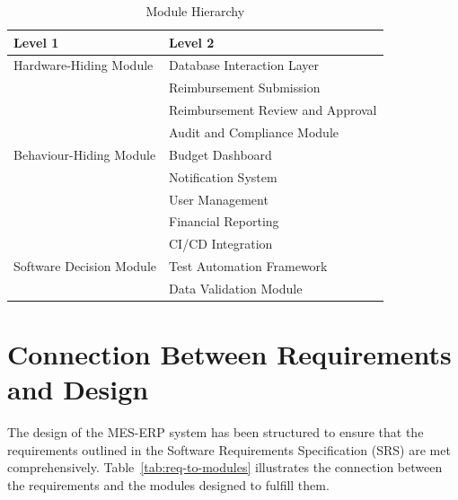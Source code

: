 \documentclass[12pt, titlepage]{article}
\begin{document}
\begin{table}[H] 
\centering
\renewcommand{\arraystretch}{1.5}
\begin{tabular}{p{} p{}}
\toprule
\textbf{Level 1} & \textbf{Level 2}\\
\midrule

{Hardware-Hiding Module} & Database Interaction Layer \\ 
\midrule

\multirow{7}{0.3\textwidth}{Behaviour-Hiding Module} & Reimbursement Submission\\
& Reimbursement Review and Approval\\
& Audit and Compliance Module\\
& Budget Dashboard\\
& Notification System\\
& User Management\\ 
& Financial Reporting\\
\midrule

\multirow{3}{0.3\textwidth}{Software Decision Module} & CI/CD Integration\\
& Test Automation Framework\\
& Data Validation Module\\
\bottomrule
\end{tabular}
\caption{Module Hierarchy}
\label{TblMH}
\end{table}


\section{Connection Between Requirements and Design}

The design of the MES-ERP system has been structured to ensure that the requirements outlined in the Software Requirements Specification (SRS) are met comprehensively. Table~\ref{tab:req-to-modules} illustrates the connection between the requirements and the modules designed to fulfill them.
\end{document}
